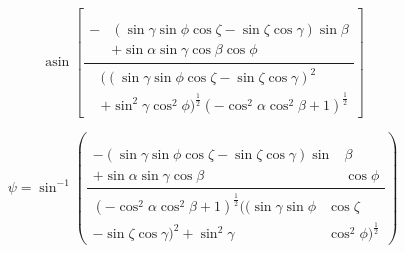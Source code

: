 \documentclass[a4paper,onecolumn,11pt]{article}
\begin{document}
\begin{equation}
    \operatorname{asin}\left[
        \frac{
            \begin{aligned}
                -& (\sin{\gamma} \sin{\phi} \cos{\zeta} - \sin{\zeta} \cos{\gamma}) \sin{\beta} \\
                &+ \sin{\alpha} \sin{\gamma} \cos{\beta} \cos{\phi }
            \end{aligned}
        }
        {
            \begin{aligned}
                &\Big((\sin{\gamma} \sin{\phi} \cos{\zeta} - \sin{\zeta} \cos{\gamma})^{2} \\
                &+ \sin^{2}{\gamma} \cos^{2}{\phi}\Big)^{\frac{1}{2}} (- \cos^{2}{\alpha} \cos^{2}{\beta} + 1)^{\frac{1}{2}}
            \end{aligned}
        }
    \right]
\end{equation}

\newpage
\begin{equation}
    \psi = \sin^{-1}{\left(
    \frac{
        \begin{aligned}
            - (\sin\gamma \sin\phi \cos\zeta
            - \sin\zeta \cos\gamma) \sin&\beta\\
            + \sin\alpha \sin\gamma \cos\beta &\cos\phi
        \end{aligned}
    }
    {
        \begin{aligned}
            (- \cos^{2}\alpha \cos^{2}\beta + 1)^{\frac{1}{2}}
            \big((\sin\gamma \sin\phi &\cos\zeta \\
            - \sin\zeta \cos\gamma)^{2} 
            + \sin^{2}\gamma &\cos^{2}\phi\big)^{\frac{1}{2}}
        \end{aligned}
    }
\right)}
\end{equation}
\end{document}
